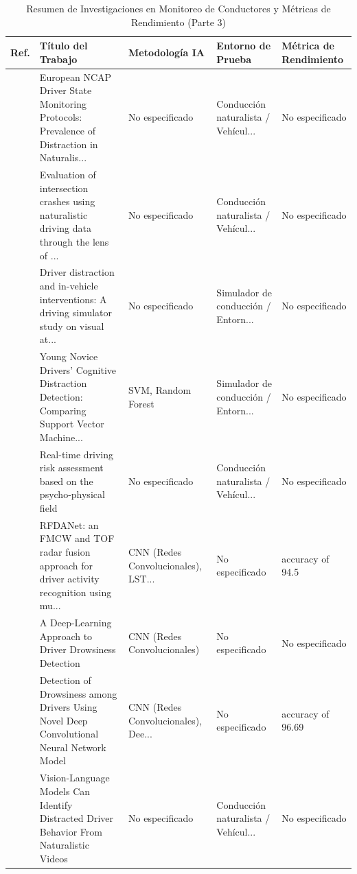 \begin{table}[htbp]
\centering
\renewcommand{\arraystretch}{1.1}
\caption{Resumen de Investigaciones en Monitoreo de Conductores y Métricas de Rendimiento (Parte 3)}
\label{tab:articulos_conductores_3}
\footnotesize
\begin{tabular}{cp{7.5cm}p{2.8cm}p{2.8cm}p{2.8cm}}
\toprule
\textbf{Ref.} & \textbf{Título del Trabajo} & \textbf{Metodología IA} & \textbf{Entorno de Prueba} & \textbf{Métrica de Rendimiento} \\
\midrule
\cite{mulhall2023european} & European NCAP Driver State Monitoring Protocols: Prevalence of Distraction in Naturalis... & No especificado & Conducción naturalista / Vehícul... & No especificado \\
\cite{galloway2023evaluation} & Evaluation of intersection crashes using naturalistic driving data through the lens of ... & No especificado & Conducción naturalista / Vehícul... & No especificado \\
\cite{amini2023distraction} & Driver distraction and in-vehicle interventions: A driving simulator study on visual at... & No especificado & Simulador de conducción / Entorn... & No especificado \\
\cite{xue2023young} & Young Novice Drivers’ Cognitive Distraction Detection: Comparing Support Vector Machine... & SVM, Random Forest & Simulador de conducción / Entorn... & No especificado \\
\cite{zhang2023realtime} & Real-time driving risk assessment based on the psycho-physical field & No especificado & Conducción naturalista / Vehícul... & No especificado \\
\cite{gu2023rfdanet} & RFDANet: an FMCW and TOF radar fusion approach for driver activity recognition using mu... & CNN (Redes Convolucionales), LST... & No especificado & accuracy of 94.5 \\
\cite{ahmed2023deeplearning} & A Deep-Learning Approach to Driver Drowsiness Detection & CNN (Redes Convolucionales) & No especificado & No especificado \\
\cite{majeed2023drowsiness} & Detection of Drowsiness among Drivers Using Novel Deep Convolutional Neural Network Model & CNN (Redes Convolucionales), Dee... & No especificado & accuracy of 96.69 \\
\cite{chen2023visionlanguage} & Vision-Language Models Can Identify Distracted Driver Behavior From Naturalistic Videos & No especificado & Conducción naturalista / Vehícul... & No especificado \\

\end{tabular}
\end{table}
